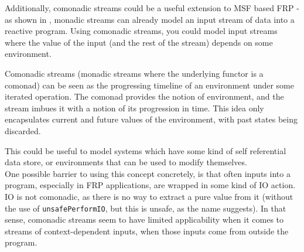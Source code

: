 Additionally, comonadic streams could be a useful extension to MSF based FRP - as shown in \cite{frp_refactored}, monadic streams can already model an input stream of data into a reactive program. Using comonadic streams, you could model input streams where the value of the input (and the rest of the stream) depends on some environment. 

Comonadic streams (monadic streams where the underlying functor is a comonad) can be seen as the progressing timeline of an environment under some iterated operation. The comonad provides the notion of environment, and the stream imbues it with a notion of its progression in time. This idea only encapsulates current and future values of the environment, with past states being discarded.

This could be useful to model systems which have some kind of self referential data store, or environments that can be used to modify themselves. \\

One possible barrier to using this concept concretely, is that often inputs into a program, especially in FRP applications, are wrapped in some kind of IO action. IO is not comonadic, as there is no way to extract a pure value from it (without the use of \verb+unsafePerformIO+, but this is unsafe, as the name suggests). In that sense, comonadic streams seem to have limited applicability when it comes to streams of context-dependent inputs, when those inputs come from outside the program.


